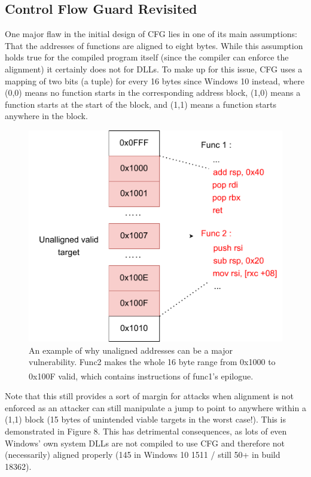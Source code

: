 \documentclass[10pt,twocolumn,a4paper]{article}
\begin{document}
\subsection{Control Flow Guard Revisited}
One major flaw in the initial design of CFG lies in one of its main assumptions: That the addresses of functions are aligned to eight bytes.
While this assumption holds true for the compiled program itself (since the compiler can enforce the alignment) it certainly does not for DLLs.
To make up for this issue, CFG uses a mapping of two bits (a tuple) for every 16 bytes since Windows 10 instead, where (0,0) means no function starts in the corresponding address block, (1,0) means a function starts at the start of the block, and (1,1) means a function starts anywhere in the block\cite{tuple}.
\begin{figure}[h]
	\includegraphics[keepaspectratio,width=\linewidth]{fig/unallignedcode}
	\caption{An example of why unaligned addresses can be a major vulnerability. Func2 makes the whole 16 byte range from 0x1000 to 0x100F valid, which contains instructions of func1's epilogue\textsuperscript{\cite{cfgexplore}}.}
\end{figure}\newline
Note that this still provides a sort of margin for attacks when alignment is not enforced as an attacker can still manipulate a jump to point to anywhere within a (1,1) block (15 bytes of unintended viable targets in the worst case!).
This is demonstrated in Figure 8.
This has detrimental consequences, as lots of even Windows' own system DLLs are not compiled to use CFG and therefore not (necessarily) aligned properly (145 in Windows 10 1511 / still 50+ in build 18362\cite{cfgbypass2}).
\end{document}
